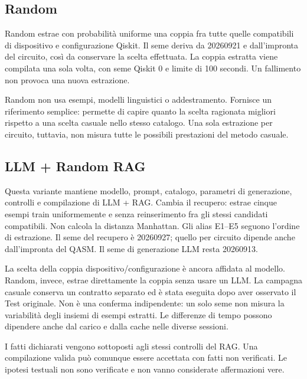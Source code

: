 
\subsection{Random}
Random estrae con probabilità uniforme una coppia fra tutte quelle compatibili
di dispositivo e configurazione Qiskit. Il seme deriva da 20260921 e
dall'impronta del circuito, così da conservare la scelta effettuata.
La coppia estratta viene compilata una sola volta, con seme Qiskit 0
e limite di 100 secondi. Un fallimento non provoca una nuova estrazione.

Random non usa esempi, modelli linguistici o addestramento.
Fornisce un riferimento semplice: permette di capire quanto la scelta
ragionata migliori rispetto a una scelta casuale nello stesso catalogo.
Una sola estrazione per circuito, tuttavia, non misura tutte le possibili
prestazioni del metodo casuale.


\subsection{LLM + Random RAG}
Questa variante mantiene modello, prompt, catalogo, parametri di generazione,
controlli e compilazione di LLM + RAG. Cambia il recupero: estrae cinque
esempi train uniformemente e senza reinserimento fra gli stessi candidati
compatibili. Non calcola la distanza Manhattan. Gli alias E1--E5 seguono
l'ordine di estrazione. Il seme del recupero è 20260927; quello per circuito
dipende anche dall'impronta del QASM. Il seme di generazione LLM resta 20260913.

La scelta della coppia dispositivo/configurazione è ancora affidata al modello.
Random, invece, estrae direttamente la coppia senza usare un LLM.
La campagna casuale conserva un contratto separato ed è stata eseguita
dopo aver osservato il Test originale. Non è una conferma indipendente:
un solo seme non misura la variabilità degli insiemi di esempi estratti.
Le differenze di tempo possono dipendere anche dal carico e dalla cache
nelle diverse sessioni.

I fatti dichiarati vengono sottoposti agli stessi controlli del RAG.
Una compilazione valida può comunque essere accettata con fatti non verificati.
Le ipotesi testuali non sono verificate e non vanno considerate affermazioni vere.
